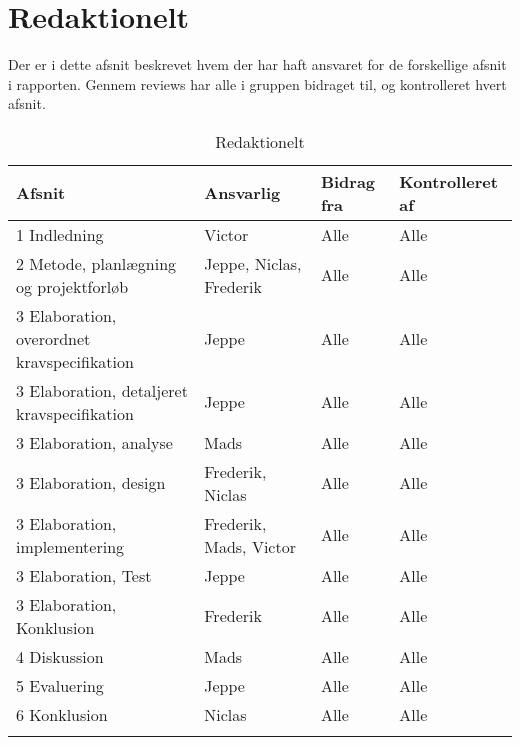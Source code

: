 \documentclass[../main.tex]{subfiles}
\begin{document}
\pagebreak 
\section*{Redaktionelt}

Der er i dette afsnit beskrevet hvem der har haft ansvaret for de forskellige afsnit i rapporten. Gennem reviews har alle i gruppen bidraget til, og kontrolleret hvert afsnit.

\begin{center}
   \small
   \begin{longtable}{| l | l | l | l |}
    \hline
	Afsnit & Ansvarlig & Bidrag fra & Kontrolleret af \\ \hline
    1 Indledning & Victor & Alle & Alle \\ \hline
    2 Metode, planlægning og projektforløb & Jeppe, Niclas, Frederik & Alle & Alle \\ \hline
    3 Elaboration, overordnet kravspecifikation & Jeppe & Alle & Alle \\ \hline
    3 Elaboration, detaljeret kravspecifikation & Jeppe & Alle & Alle \\ \hline 
    3 Elaboration, analyse & Mads & Alle & Alle \\ \hline
    3 Elaboration, design & Frederik, Niclas & Alle & Alle \\ \hline
    3 Elaboration, implementering & Frederik, Mads, Victor & Alle & Alle \\ \hline
    3 Elaboration, Test & Jeppe & Alle & Alle \\ \hline
    3 Elaboration, Konklusion & Frederik & Alle & Alle \\ \hline
    4 Diskussion & Mads & Alle & Alle \\ \hline
   	5 Evaluering & Jeppe & Alle & Alle \\ \hline
    6 Konklusion & Niclas & Alle & Alle \\ \hline
    \caption{Redaktionelt}
    \label{tab:redaktionelt}
    \end{longtable}
\end{center}

\newpage
\end{document}
